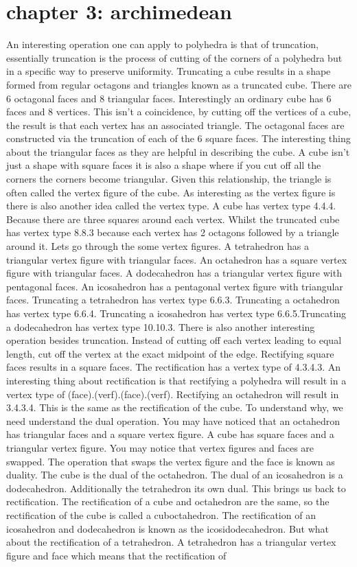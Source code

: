 \documentclass{article}
\begin{document}
\section*{chapter 3: archimedean}
An interesting operation one can apply to polyhedra is that of truncation, essentially truncation is the process of cutting of the corners of a polyhedra but in a specific way to preserve uniformity. Truncating a cube results in a shape formed from regular octagons and triangles known as a truncated cube. There are 6 octagonal faces and 8 triangular faces. Interestingly an ordinary cube has 6 faces and 8 vertices. This isn't a coincidence, by cutting off the vertices of a cube, the result is that each vertex has an associated triangle. The octagonal faces are constructed via the truncation of each of the 6 square faces. The interesting thing about the triangular faces as they are helpful in describing the cube. A cube isn't just a shape with square faces it is also a shape where if you cut off all the corners the corners become triangular. Given this relationship, the triangle is often called the vertex figure of the cube. As interesting as the vertex figure is there is also another idea called the vertex type. A cube has vertex type 4.4.4. Because there are three squares around each vertex. Whilst the truncated cube has vertex type 8.8.3 because each vertex has 2 octagons followed by a triangle around it. Lets go through the some vertex figures. A tetrahedron has a triangular vertex figure with triangular faces. An octahedron has a square vertex figure with triangular faces. A dodecahedron has a triangular vertex figure with pentagonal faces. An icosahedron has a pentagonal vertex figure with triangular faces. Truncating a tetrahedron has vertex type 6.6.3. Truncating a octahedron has vertex type 6.6.4. Truncating a icosahedron has vertex type 6.6.5.Truncating a dodecahedron has vertex type 10.10.3. There is also another interesting operation besides truncation. Instead of cutting off each vertex leading to equal length, cut off the vertex at the exact midpoint of the edge. Rectifying square faces results in a square faces. The rectification has a vertex type of 4.3.4.3. An interesting thing about rectification is that rectifying a polyhedra will result in a vertex type of (face).(verf).(face).(verf). Rectifying an octahedron will result in 3.4.3.4. This is the same as the rectification of the cube. To understand why, we need understand the dual operation. You may have noticed that an octahedron has triangular faces and a square vertex figure. A cube has square faces and a triangular vertex figure. You may notice that vertex figures and faces are swapped. The operation that swaps the vertex figure and the face is known as duality. The cube is the dual of the octahedron. The dual of an icosahedron is a dodecahedron. Additionally the tetrahedron its own dual. This brings us back to rectification. The rectification of a cube and octahedron are the same, so the rectification of the cube is called a cuboctahedron. The rectification of an icosahedron and dodecahedron is known as the icosidodecahedron. But what about the rectification of a tetrahedron. A tetrahedron has a triangular vertex figure and face which means that the rectification of 
\end{document}
